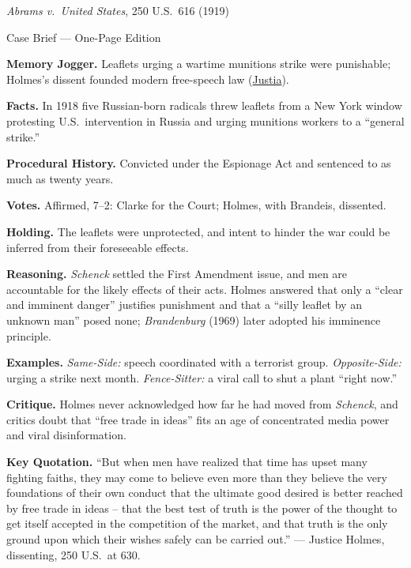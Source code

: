 \documentclass[12pt]{article}
\begin{document}
\begin{center}
{\Large \textit{Abrams v.\ United States}, 250 U.S.\ 616 (1919)\par}
\vspace{0.3em}
{\normalsize Case Brief --- One-Page Edition\par}
\end{center}

\textbf{Memory Jogger.} Leaflets urging a wartime munitions strike were punishable; Holmes's dissent founded modern free-speech law (\href{https://supreme.justia.com/cases/federal/us/250/616/}{Justia}).

\textbf{Facts.} In 1918 five Russian-born radicals threw leaflets from a New York window protesting U.S.\ intervention in Russia and urging munitions workers to a ``general strike.''

\textbf{Procedural History.} Convicted under the Espionage Act and sentenced to as much as twenty years.

\textbf{Votes.} Affirmed, 7--2: Clarke for the Court; Holmes, with Brandeis, dissented.

\textbf{Holding.} The leaflets were unprotected, and intent to hinder the war could be inferred from their foreseeable effects.

\textbf{Reasoning.} \textit{Schenck} settled the First Amendment issue, and men are accountable for the likely effects of their acts. Holmes answered that only a ``clear and imminent danger'' justifies punishment and that a ``silly leaflet by an unknown man'' posed none; \textit{Brandenburg} (1969) later adopted his imminence principle.

\textbf{Examples.} \emph{Same-Side:} speech coordinated with a terrorist group. \emph{Opposite-Side:} urging a strike next month. \emph{Fence-Sitter:} a viral call to shut a plant ``right now.''

\textbf{Critique.} Holmes never acknowledged how far he had moved from \textit{Schenck}, and critics doubt that ``free trade in ideas'' fits an age of concentrated media power and viral disinformation.

\textbf{Key Quotation.} ``But when men have realized that time has upset many fighting faiths, they may come to believe even more than they believe the very foundations of their own conduct that the ultimate good desired is better reached by free trade in ideas -- that the best test of truth is the power of the thought to get itself accepted in the competition of the market, and that truth is the only ground upon which their wishes safely can be carried out.'' --- Justice Holmes, dissenting, 250 U.S.\ at 630.
\end{document}
